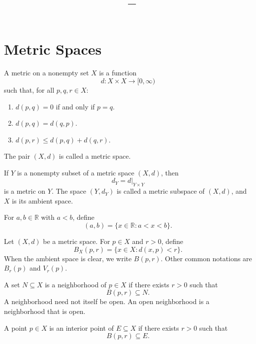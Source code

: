 \documentclass[answers,12pt,addpoints]{exam}
\author{\name}
\title{\course\ -- \assignment}
\begin{document}
\maketitle

\newpage
\section{Metric Spaces}

\begin{definition}
A metric on a nonempty set $X$ is a function
\[
d:X\times X\longrightarrow [0,\infty)
\]
such that, for all $p,q,r\in X$:
\begin{enumerate}
    \item $d(p,q)=0$ if and only if $p=q$.
    \item $d(p,q)=d(q,p)$.
    \item $d(p,r)\leq d(p,q)+d(q,r)$.
\end{enumerate}
The pair $(X,d)$ is called a metric space.
\end{definition}

\begin{remark}
If $Y$ is a nonempty subset of a metric space $(X,d)$, then
\[
d_Y=d|_{Y\times Y}
\]
is a metric on $Y$. The space $(Y,d_Y)$ is called a metric
subspace of $(X,d)$, and $X$ is its ambient space.
\end{remark}

\begin{definition}
For $a,b\in\mathbb{R}$ with $a<b$, define
\[
(a,b)=\{x\in\mathbb{R}:a<x<b\}.
\]
\end{definition}

\begin{definition}
Let $(X,d)$ be a metric space. For $p\in X$ and $r>0$, define
\[
B_X(p,r)=\{x\in X:d(x,p)<r\}.
\]
When the ambient space is clear, we write $B(p,r)$.
Other common notations are $B_r(p)$ and $V_r(p)$.
\end{definition}

\begin{definition}
A set $N\subseteq X$ is a neighborhood of $p\in X$ if there
exists $r>0$ such that
\[
B(p,r)\subseteq N.
\]
A neighborhood need not itself be open.
An open neighborhood is a neighborhood that is open.
\end{definition}

\begin{definition}
A point $p\in X$ is an interior point of $E\subseteq X$ if
there exists $r>0$ such that
\[
B(p,r)\subseteq E.
\]
\end{definition}
\end{document}
